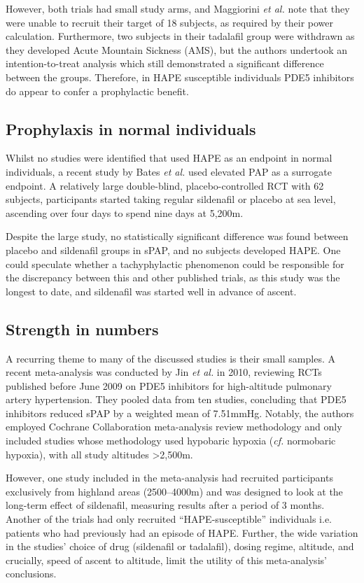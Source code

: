 \documentclass[10pt,a4paper]{article}
\begin{document}
However, both trials had small study arms, and Maggiorini \emph{et al.} note that they were unable to recruit their target of 18 subjects, as required by their power calculation. Furthermore, two subjects in their tadalafil group were withdrawn as they developed Acute Mountain Sickness (AMS), but the authors undertook an intention-to-treat analysis which still demonstrated a significant difference between the groups. Therefore, in HAPE susceptible individuals PDE5 inhibitors do appear to confer a prophylactic benefit.

\subsection*{Prophylaxis in normal individuals}

Whilst no studies were identified that used HAPE as an endpoint in normal individuals, a recent study by Bates \emph{et al.} used elevated PAP as a surrogate endpoint.\cite{Bates:2011du} A relatively large double-blind, placebo-controlled RCT with 62 subjects, participants started taking regular sildenafil or placebo at sea level, ascending over four days to spend nine days at 5,200m.

Despite the large study, no statistically significant difference was found between placebo and sildenafil groups in sPAP, and no subjects developed HAPE. One could speculate whether a tachyphylactic phenomenon could be responsible for the discrepancy between this and other published trials, as this study was the longest to date, and sildenafil was started well in advance of ascent.

\subsection*{Strength in numbers}

A recurring theme to many of the discussed studies is their small samples. A recent meta-analysis was conducted by Jin \emph{et al.} in 2010, reviewing RCTs published before June 2009 on PDE5 inhibitors for high-altitude pulmonary artery hypertension.\cite{Jin:2010fc} They pooled data from ten studies, concluding that PDE5 inhibitors reduced sPAP by a weighted mean of 7.51mmHg. Notably, the authors employed Cochrane Collaboration meta-analysis review methodology and only included studies whose methodology used hypobaric hypoxia (\emph{cf.} normobaric hypoxia), with all study altitudes >2,500m.

However, one study included in the meta-analysis had recruited participants exclusively from highland areas (2500--4000m) and was designed to look at the long-term effect of sildenafil, measuring results after a period of 3 months.\cite{Aldashev:2005fr} Another of the trials had only recruited ``HAPE-susceptible'' individuals i.e. patients who had previously had an episode of HAPE.\cite{Maggiorini:2006kz} Further, the wide variation in the studies' choice of drug (sildenafil or tadalafil), dosing regime, altitude, and crucially, speed of ascent to altitude, limit the utility of this meta-analysis' conclusions.
\end{document}
